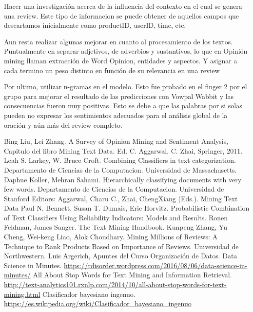 \documentclass[a4paper,11pt]{report}
\begin{document}
Hacer una investigación acerca de la influencia del contexto en el cual se genera una review. Este tipo de informacion se puede obtener de aquellos campos que descartamos inicialmente como productID, userID, time, etc.

Aun resta realizar algunas mejorar en cuanto al procesamiento de los textos. Puntualmente en separar adjetivos, de adverbios y sustantivos, lo que en Opinión mining llaman extracción de Word Opinion, entidades y aspectos. Y asignar a cada termino un peso distinto en función de su relevancia en una review 

Por ultimo, utilizar n-gramas en el modelo. Esto fue probado en el finger 2 por el grupo para mejorar el resultado de las predicciones con Vowpal Wabbit y las consecuencias fueron muy positivas. Esto se debe a que las palabras por si solas pueden no expresar los sentimientos adecuados para el análisis global de la oración y aún más del review completo.



\begin{thebibliography}{99}
 Bing Liu, Lei Zhang. A Survey of Opinion Mining and Sentiment Analysis, Capitulo del libro Mining Text Data. Ed. C. Aggarwal, C. Zhai, Springer, 2011.
 Leah S. Larkey, W. Bruce Croft. Combining Classifiers in text categorization. Departamento de Ciencias de la Computacion. Universidad de Massachusetts.
 Daphne Koller, Mehran Sahami. Hierarchically classifying documents with very few words. Departamento de Ciencias de la Computacion. Universidad de Stanford
 Editors: Aggarwal, Charu C., Zhai, ChengXiang (Eds.). Mining Text Data
 Paul N. Bennett, Susan T. Dumais, Eric Horvitz. Probabilistic Combination of Text Classifiers Using Reliability Indicators: Models and Results.
Ronen Feldman, James Sanger. The Text Mining Handbook.
 Kunpeng Zhang, Yu Cheng, Wei-keng Liao, Alok Choudhary. Mining Millions of Reviews: A Technique to Rank Products Based on Importance of Reviews. Universidad de Northwestern.
 Luis Argerich, Apuntes del Curso Organización de Datos.
 Data Science in Minutes. 
\url{ https://rdisorder.wordpress.com/2016/08/06/data-science-in-minutes/}
 All About Stop Words for Text Mining and Information Retrieval. 
\url{http://text-analytics101.rxnlp.com/2014/10/all-about-stop-words-for-text-mining.html}
 Clasificador bayesiano ingenuo. 
\url{https://es.wikipedia.org/wiki/Clasificador_bayesiano_ingenuo}
\end{thebibliography}
\end{document}
